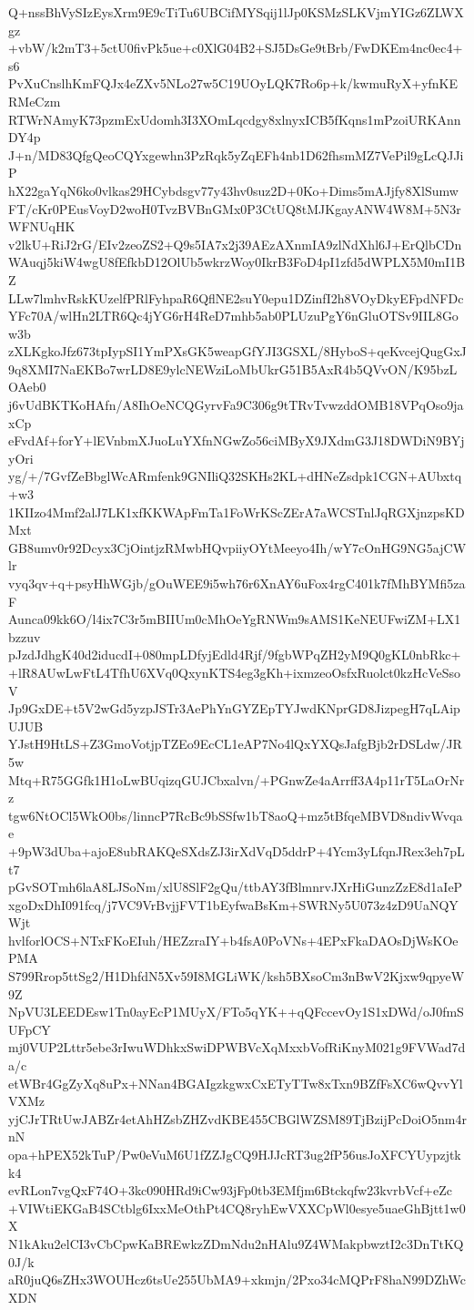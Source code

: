 Q+nssBhVySIzEysXrm9E9cTiTu6UBCifMYSqij1lJp0KSMzSLKVjmYIGz6ZLWXgz
+vbW/k2mT3+5ctU0fivPk5ue+c0XlG04B2+SJ5DsGe9tBrb/FwDKEm4nc0ec4+s6
PvXuCnslhKmFQJx4eZXv5NLo27w5C19UOyLQK7Ro6p+k/kwmuRyX+yfnKERMeCzm
RTWrNAmyK73pzmExUdomh3I3XOmLqcdgy8xlnyxICB5fKqns1mPzoiURKAnnDY4p
J+n/MD83QfgQeoCQYxgewhn3PzRqk5yZqEFh4nb1D62fhsmMZ7VePil9gLcQJJiP
hX22gaYqN6ko0vlkas29HCybdsgv77y43hv0suz2D+0Ko+Dims5mAJjfy8XlSumw
FT/cKr0PEusVoyD2woH0TvzBVBnGMx0P3CtUQ8tMJKgayANW4W8M+5N3rWFNUqHK
v2lkU+RiJ2rG/EIv2zeoZS2+Q9s5IA7x2j39AEzAXnmIA9zlNdXhl6J+ErQlbCDn
WAuqj5kiW4wgU8fEfkbD12OlUb5wkrzWoy0IkrB3FoD4pI1zfd5dWPLX5M0mI1BZ
LLw7lmhvRskKUzelfPRlFyhpaR6QflNE2suY0epu1DZinfI2h8VOyDkyEFpdNFDc
YFc70A/wlHn2LTR6Qc4jYG6rH4ReD7mhb5ab0PLUzuPgY6nGluOTSv9IIL8Gow3b
zXLKgkoJfz673tpIypSI1YmPXsGK5weapGfYJI3GSXL/8HyboS+qeKvcejQugGxJ
9q8XMI7NaEKBo7wrLD8E9ylcNEWziLoMbUkrG51B5AxR4b5QVvON/K95bzLOAeb0
j6vUdBKTKoHAfn/A8IhOeNCQGyrvFa9C306g9tTRvTvwzddOMB18VPqOso9jaxCp
eFvdAf+forY+lEVnbmXJuoLuYXfnNGwZo56ciMByX9JXdmG3J18DWDiN9BYjyOri
yg/+/7GvfZeBbglWcARmfenk9GNIliQ32SKHs2KL+dHNeZsdpk1CGN+AUbxtq+w3
1KIIzo4Mmf2alJ7LK1xfKKWApFmTa1FoWrKScZErA7aWCSTnlJqRGXjnzpsKDMxt
GB8umv0r92Dcyx3CjOintjzRMwbHQvpiiyOYtMeeyo4Ih/wY7cOnHG9NG5ajCWlr
vyq3qv+q+psyHhWGjb/gOuWEE9i5wh76r6XnAY6uFox4rgC401k7fMhBYMfi5zaF
Aunca09kk6O/l4ix7C3r5mBIIUm0cMhOeYgRNWm9sAMS1KeNEUFwiZM+LX1bzzuv
pJzdJdhgK40d2iducdI+080mpLDfyjEdld4Rjf/9fgbWPqZH2yM9Q0gKL0nbRkc+
+lR8AUwLwFtL4TfhU6XVq0QxynKTS4eg3gKh+ixmzeoOsfxRuolct0kzHcVeSsoV
Jp9GxDE+t5V2wGd5yzpJSTr3AePhYnGYZEpTYJwdKNprGD8JizpegH7qLAipUJUB
YJstH9HtLS+Z3GmoVotjpTZEo9EcCL1eAP7No4lQxYXQsJafgBjb2rDSLdw/JR5w
Mtq+R75GGfk1H1oLwBUqizqGUJCbxalvn/+PGnwZe4aArrff3A4p11rT5LaOrNrz
tgw6NtOCl5WkO0bs/linncP7RcBc9bSSfw1bT8aoQ+mz5tBfqeMBVD8ndivWvqae
+9pW3dUba+ajoE8ubRAKQeSXdsZJ3irXdVqD5ddrP+4Ycm3yLfqnJRex3eh7pLt7
pGvSOTmh6laA8LJSoNm/xlU8SlF2gQu/ttbAY3fBlmnrvJXrHiGunzZzE8d1aIeP
xgoDxDhI091fcq/j7VC9VrBvjjFVT1bEyfwaBsKm+SWRNy5U073z4zD9UaNQYWjt
hvlforlOCS+NTxFKoEIuh/HEZzraIY+b4fsA0PoVNs+4EPxFkaDAOsDjWsKOePMA
S799Rrop5ttSg2/H1DhfdN5Xv59I8MGLiWK/ksh5BXsoCm3nBwV2Kjxw9qpyeW9Z
NpVU3LEEDEsw1Tn0ayEcP1MUyX/FTo5qYK++qQFccevOy1S1xDWd/oJ0fmSUFpCY
mj0VUP2Lttr5ebe3rIwuWDhkxSwiDPWBVcXqMxxbVofRiKnyM021g9FVWad7da/c
etWBr4GgZyXq8uPx+NNan4BGAIgzkgwxCxETyTTw8xTxn9BZfFsXC6wQvvYlVXMz
yjCJrTRtUwJABZr4etAhHZsbZHZvdKBE455CBGlWZSM89TjBzijPcDoiO5nm4rnN
opa+hPEX52kTuP/Pw0eVuM6U1fZZJgCQ9HJJcRT3ug2fP56usJoXFCYUypzjtkk4
evRLon7vgQxF74O+3kc090HRd9iCw93jFp0tb3EMfjm6Btckqfw23kvrbVcf+eZc
+VIWtiEKGaB4SCtblg6IxxMeOthPt4CQ8ryhEwVXXCpWl0esye5uaeGhBjtt1w0X
N1kAku2elCI3vCbCpwKaBREwkzZDmNdu2nHAlu9Z4WMakpbwztI2c3DnTtKQ0J/k
aR0juQ6sZHx3WOUHcz6tsUe255UbMA9+xkmjn/2Pxo34cMQPrF8haN99DZhWcXDN
